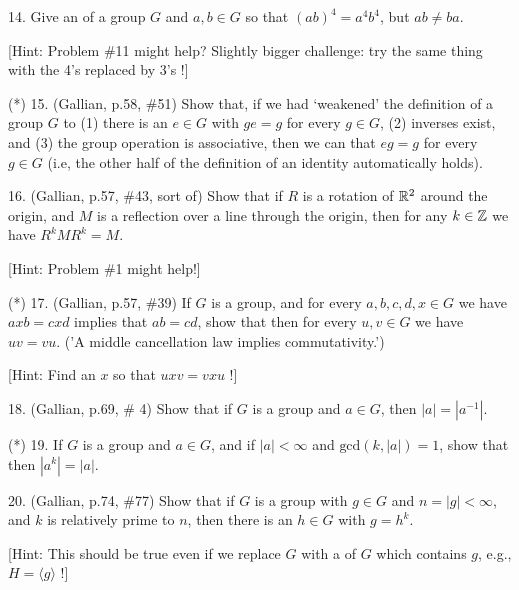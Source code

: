 \documentclass[12pt]{article}
\begin{document}
\begin{description}


\item{14.} Give an  of a group $G$ and $a,b\in G$ so that 
$(ab)^4=a^4b^4$, but $ab\neq ba$. 

\ssk

\item{\spc} [Hint: Problem \#11 might help? Slightly bigger challenge: try the
same thing with the 4's replaced by 3's !]
 

\msk

\item{(*) 15.} (Gallian, p.58, \#51) Show that, if we had `weakened' the definition of a 
group $G$ to (1) there is an $e\in G$ with $ge=g$ for every $g\in G$, (2) inverses
exist, and (3) the group operation is associative, then we can  that
$eg=g$ for every $g\in G$ (i.e, the other half of the definition of an identity
automatically holds).

\msk

\item{16.} (Gallian, p.57, \#43, sort of) Show that if $R$ is a rotation of ${\mathbb R}^2$
around the origin, and $M$ is a reflection over a line through the origin, then for 
any $k\in{\mathbb Z}$ we have $R^kMR^k=M$.

\ssk

\item{\spc} [Hint: Problem \#1 might help!]

\msk

\item{(*) 17.} (Gallian, p.57, \#39) If $G$ is a group, and for every $a,b,c,d,x\in G$
we have $axb=cxd$ implies that $ab=cd$, show that then for every $u,v\in G$ we 
have $uv=vu$. ('A middle cancellation law implies commutativity.')

\ssk

\item{\spc} [Hint: Find an $x$ so that $uxv=vxu$ !]

\msk

\item{18.} (Gallian, p.69, \# 4) Show that if $G$ is a group and $a\in G$, 
then $|a|=|a^{-1}|$. 

\msk

\item{(*) 19.} If $G$ is a group and $a\in G$, and if $|a|<\infty$ and $\textrm{gcd}(k,|a|)=1$, 
show that then $|a^k|=|a|$.

\msk

\item{20.} (Gallian, p.74, \#77) Show that if $G$ is a group with $g\in G$ and $n=|g|<\infty$,
and $k$ is relatively prime to $n$, then there is an $h\in G$
with $g=h^k$. 

\ssk

[Hint: This should be true even if we replace $G$ with a 
 of $G$ which contains $g$, e.g., $H=\langle g\rangle$ !]


\end{description}
\vfill
\end{document}
